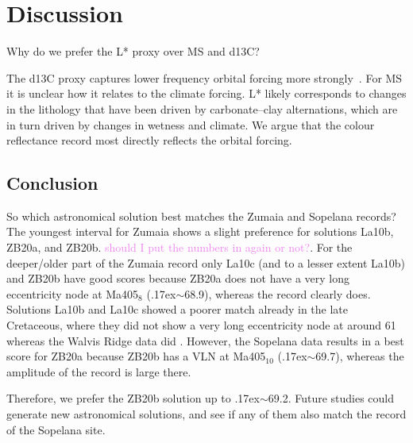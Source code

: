 \documentclass[draft]{agujournal2019}
\newcommand{\appr}{\raise.17ex\hbox{$\scriptstyle\sim$}} %
\newcommand{\ijk}{\textcolor{violet}}
\begin{document}
\section{Discussion}\label{sec:discussion}


Why do we prefer the \gls{L*} proxy over \gls{MS} and \gls{d13C}?

The \gls{d13C} proxy captures lower frequency orbital forcing more strongly~\cite{Zeebe2017,Kocken2019loscar}.
For \gls{MS} it is unclear how it relates to the climate forcing. %
\gls{L*} likely corresponds to changes in the lithology that have been driven by carbonate--clay alternations, which are in turn driven by changes in wetness and climate.
We argue that the colour reflectance record most directly reflects the orbital forcing.


\subsection{Conclusion}\label{sec:conclusion}

So which astronomical solution best matches the Zumaia and Sopelana records?
The youngest interval for Zumaia shows a slight preference for solutions La10b, ZB20a, and ZB20b.
\ijk{should I put the numbers in again or not?}.
For the deeper/older part of the Zumaia record only La10c (and to a lesser extent La10b) and ZB20b have good scores because ZB20a does not have a very long eccentricity node at Ma405\(_{8}\) (\appr\qty{68.9}{\millionyearago}), whereas the record clearly does.
Solutions La10b and La10c showed a poorer match already in the late Cretaceous, where they did not show a very long eccentricity node at around \qty{61}{\millionyearago} whereas the Walvis Ridge data did \cite{ZeebeLourens2022EPSL}.
However, the Sopelana data results in a best score for ZB20a because ZB20b has a VLN at Ma405\(_{10}\) (\appr\qty{69.7}{\millionyearago}), whereas the amplitude of the record is large there.

Therefore, we prefer the ZB20b solution up to \appr\qty{69.2}{\millionyearago}.
Future studies could generate new astronomical solutions, and see if any of them also match the record of the Sopelana site.


\end{document}
